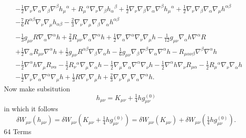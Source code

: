 \documentclass[10pt,letterpaper]{article}
\begin{document}
\begin{align}
& -  \tfrac{1}{2} \nabla_{\nu}\nabla_{\alpha}\nabla_{\beta}\nabla^{\beta}h_{\mu}{}^{\alpha}
 + R_{\mu}{}^{\alpha} \nabla_{\nu}\nabla_{\beta}h_{\alpha}{}^{\beta}
 + \tfrac{1}{2} \nabla_{\nu}\nabla_{\beta}\nabla_{\alpha}\nabla^{\beta}h_{\mu}{}^{\alpha}
 + \tfrac{1}{2} \nabla_{\nu}\nabla_{\beta}\nabla_{\alpha}\nabla_{\mu}h^{\alpha \beta}\nonumber\\
& -  \tfrac{7}{6} R^{\alpha \beta} \nabla_{\nu}\nabla_{\mu}h_{\alpha \beta}
 -  \tfrac{2}{3} \nabla_{\nu}\nabla_{\mu}\nabla_{\beta}\nabla_{\alpha}h^{\alpha \beta}\nonumber \\ \nonumber
\\
&- \tfrac{1}{3} g_{\mu \nu} R \nabla_{\alpha}\nabla^{\alpha}h
 + \tfrac{2}{3} R_{\mu \nu} \nabla_{\alpha}\nabla^{\alpha}h
 + \tfrac{1}{2} \nabla_{\alpha}\nabla^{\alpha}\nabla_{\nu}\nabla_{\mu}h
 -  \tfrac{1}{12} g_{\mu \nu} \nabla_{\alpha}h \nabla^{\alpha}R\nonumber\\
& + \tfrac{1}{2} \nabla_{\alpha}R_{\mu \nu} \nabla^{\alpha}h
 + \tfrac{1}{2} g_{\mu \nu} R^{\alpha \beta} \nabla_{\beta}\nabla_{\alpha}h
 -  \tfrac{1}{6} g_{\mu \nu} \nabla_{\beta}\nabla^{\beta}\nabla_{\alpha}\nabla^{\alpha}h
 -  R_{\mu \alpha \nu \beta} \nabla^{\beta}\nabla^{\alpha}h\nonumber\\
& -  \tfrac{1}{2} \nabla^{\alpha}h \nabla_{\mu}R_{\nu \alpha}
 -  \tfrac{1}{2} R_{\nu}{}^{\alpha} \nabla_{\mu}\nabla_{\alpha}h
 -  \tfrac{1}{2} \nabla_{\mu}\nabla_{\alpha}\nabla^{\alpha}\nabla_{\nu}h
 -  \tfrac{1}{2} \nabla^{\alpha}h \nabla_{\nu}R_{\mu \alpha}
 -  \tfrac{1}{2} R_{\mu}{}^{\alpha} \nabla_{\nu}\nabla_{\alpha}h\nonumber\\
& -  \tfrac{1}{2} \nabla_{\nu}\nabla_{\alpha}\nabla^{\alpha}\nabla_{\mu}h
 + \tfrac{1}{3} R \nabla_{\nu}\nabla_{\mu}h
 + \tfrac{2}{3} \nabla_{\nu}\nabla_{\mu}\nabla_{\alpha}\nabla^{\alpha}h.
\end{align}
Now make subsitution
\begin{equation}
	h_{\mu\nu} = K_{\mu\nu} + \tfrac14 hg_{\mu\nu}^{(0)}
\end{equation}
in which it follows
\begin{equation}
	\delta W_{\mu\nu}(h_{\mu\nu}) = \delta W_{\mu\nu}(K_{\mu\nu} + \tfrac14 hg_{\mu\nu}^{(0)}) = \delta W_{\mu\nu}(K_{\mu\nu})+\delta W_{\mu\nu}(\tfrac14 hg_{\mu\nu}^{(0)}).
\end{equation}
64 Terms
\end{document}
